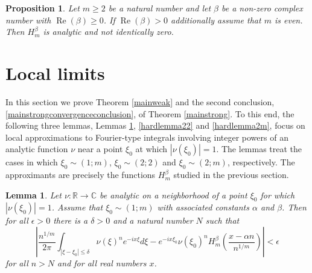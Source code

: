 \documentclass{article}
\theoremstyle{theorem}
\newtheorem{lemma}[theorem]{Lemma}
\newtheorem{proposition}[theorem]{Proposition}
\theoremstyle{remark}
\renewcommand\Re{\operatorname{Re}}%
\begin{document}
\begin{proposition}\label{Hanalytic}
Let $m\geq 2$ be a natural number and let $\beta$ be a non-zero complex number
with $\Re(\beta)\geq 0$. If $\Re(\beta)>0$ additionally assume that
$m$ is even. Then $H_m^{\beta}$ is analytic and not identically zero.
\end{proposition}






\section{Local limits}\label{locallimitsec}

\noindent In this section we prove Theorem \ref{mainweak} and the second conclusion, \eqref{mainstrongconvergenceconclusion}, of Theorem \ref{mainstrong}. To this end, the following three lemmas, Lemmas \ref{easylemma}, \ref{hardlemma22} and \ref{hardlemma2m}, focus on local approximations to Fourier-type integrals involving integer powers of an analytic function $\nu$ near a point $\xi_0$ at which $|\nu(\xi_0)|=1$. The lemmas treat the cases in which $\xi_0\sim(1;m)$, $\xi_0\sim(2;2)$ and $\xi_0\sim(2;m)$, respectively. The approximants are precisely the functions $H_m^{\beta}$ studied in the previous section.

\begin{lemma}\label{easylemma}
Let  $\nu:\mathbb{R}\rightarrow\mathbb{C}$ be analytic on a neighborhood of a point $\xi_0$ for which $|\nu(\xi_0)|=1$. Assume that $\xi_0\sim (1;m)$ with associated constants $\alpha$ and
$\beta$. Then for all $\epsilon>0$ there is a $\delta >0$
and a natural number $N$ such that
\begin{equation}
 \left|\frac{n^{1/m}}{2\pi}\int_{|\xi-\xi_0|\leq\delta}\nu(\xi)^n
e^{-ix\xi}d\xi-e^{-ix\xi_0}\nu(\xi_0)^n H_{m}^{\beta}\left(\frac{x-\alpha
n}{n^{1/m}}\right)\right|<\epsilon
\end{equation}
for all $n>N$ and for all real numbers $x$.
\end{lemma}
\end{document}
